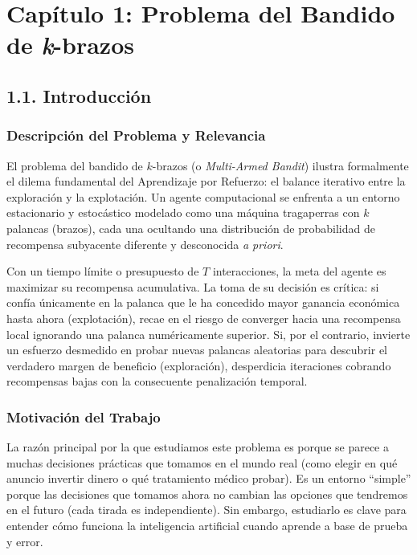 \section{\texorpdfstring{Capítulo 1: Problema del Bandido de
\emph{k}-brazos}{Capítulo 1: Problema del Bandido de k-brazos}}\label{capuxedtulo-1-problema-del-bandido-de-k-brazos}

\subsection{1.1. Introducción}\label{introducciuxf3n}

\subsubsection{Descripción del Problema y
Relevancia}\label{descripciuxf3n-del-problema-y-relevancia}

El problema del bandido de \(k\)-brazos (o \emph{Multi-Armed Bandit})
ilustra formalmente el dilema fundamental del Aprendizaje por Refuerzo:
el balance iterativo entre la exploración y la explotación. Un agente
computacional se enfrenta a un entorno estacionario y estocástico
modelado como una máquina tragaperras con \(k\) palancas (brazos), cada
una ocultando una distribución de probabilidad de recompensa subyacente
diferente y desconocida \emph{a priori}.

Con un tiempo límite o presupuesto de \(T\) interacciones, la meta del
agente es maximizar su recompensa acumulativa. La toma de su decisión es
crítica: si confía únicamente en la palanca que le ha concedido mayor
ganancia económica hasta ahora (explotación), recae en el riesgo de
converger hacia una recompensa local ignorando una palanca numéricamente
superior. Si, por el contrario, invierte un esfuerzo desmedido en probar
nuevas palancas aleatorias para descubrir el verdadero margen de
beneficio (exploración), desperdicia iteraciones cobrando recompensas
bajas con la consecuente penalización temporal.

\subsubsection{Motivación del Trabajo}\label{motivaciuxf3n-del-trabajo}

La razón principal por la que estudiamos este problema es porque se
parece a muchas decisiones prácticas que tomamos en el mundo real (como
elegir en qué anuncio invertir dinero o qué tratamiento médico probar).
Es un entorno ``simple'' porque las decisiones que tomamos ahora no
cambian las opciones que tendremos en el futuro (cada tirada es
independiente). Sin embargo, estudiarlo es clave para entender cómo
funciona la inteligencia artificial cuando aprende a base de prueba y
error.

